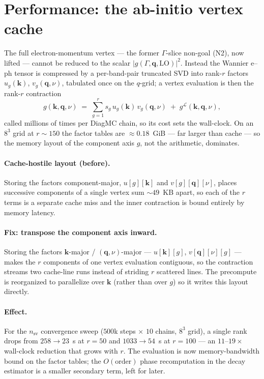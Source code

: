 \documentclass[11pt]{article}
\newcommand{\kv}{\mathbf{k}}
\newcommand{\qv}{\mathbf{q}}
\newcommand{\glong}{g^{\mathcal{L}}}
\begin{document}
\section{Performance: the ab-initio vertex cache}
\label{sec:performance}

The full electron-momentum vertex --- the former $\Gamma$-slice non-goal (N2), now lifted ---
cannot be reduced to the scalar $|g(\Gamma,\qv,\mathrm{LO})|^{2}$. Instead the Wannier e--ph tensor is
compressed by a per-band-pair truncated SVD into rank-$r$ factors $u_{g}(\kv)$,
$v_{g}(\qv,\nu)$, tabulated once on the $q$-grid; a vertex evaluation is then the rank-$r$
contraction
\[
  g(\kv,\qv,\nu)\;=\;\sum_{g=1}^{r} s_{g}\,u_{g}(\kv)\,v_{g}(\qv,\nu)\;+\;\glong(\kv,\qv,\nu),
\]
called millions of times per DiagMC chain, so its cost sets the wall-clock. On an $8^{3}$
grid at $r\!\sim\!150$ the factor tables are $\approx0.18$~GiB --- far larger than cache ---
so the memory layout of the component axis $g$, not the arithmetic, dominates.

\paragraph{Cache-hostile layout (before).} Storing the factors component-major,
$u[g][\kv]$ and $v[g][\qv][\nu]$, places successive components of a single vertex sum
$\sim\!49$~KB apart, so each of the $r$ terms is a separate cache miss and the inner
contraction is bound entirely by memory latency.

\paragraph{Fix: transpose the component axis inward.} Storing the factors $\kv$-major /
$(\qv,\nu)$-major --- $u[\kv][g]$, $v[\qv][\nu][g]$ --- makes the $r$ components of one
vertex evaluation contiguous, so the contraction streams two cache-line runs instead of
striding $r$ scattered lines. The precompute is reorganized to parallelize over $\kv$
(rather than over $g$) so it writes this layout directly.

\paragraph{Effect.} For the $n_{\mathrm{sv}}$ convergence sweep ($500$k steps $\times$ $10$
chains, $8^{3}$ grid), a single rank drops from $258\to23$~s at $r{=}50$ and
$1033\to54$~s at $r{=}100$ --- an $11$--$19\times$ wall-clock reduction that grows with $r$.
The evaluation is now memory-bandwidth bound on the factor tables; the $O(\text{order})$
phase recomputation in the decay estimator is a smaller secondary term, left for later.
\end{document}
